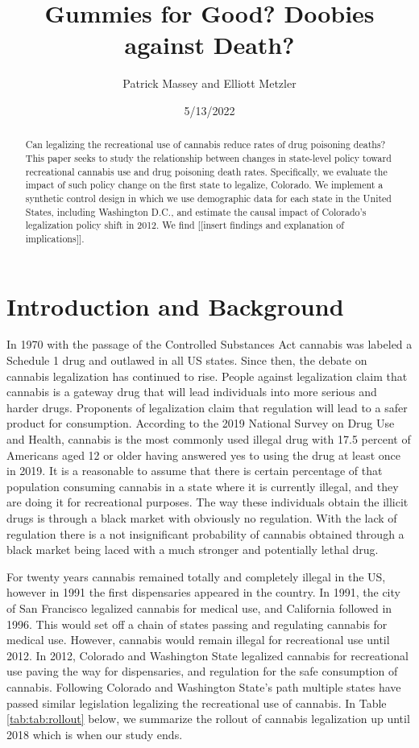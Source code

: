 \documentclass{article}
\author{Patrick Massey and Elliott Metzler}
\title{Gummies for Good? Doobies against Death?}
\date{5/13/2022}
\begin{document}
\maketitle

\begin{abstract}

Can legalizing the recreational use of cannabis reduce rates of drug poisoning deaths? This paper seeks to study the relationship between changes in state-level policy toward recreational cannabis use and drug poisoning death rates. Specifically, we evaluate the impact of such policy change on the first state to legalize, Colorado. We implement a synthetic control design in which we use demographic data for each state in the United States, including Washington D.C., and estimate the causal impact of Colorado's legalization policy shift in 2012. We find [[insert findings and explanation of implications]].

\end{abstract}

\newpage

\section{Introduction and Background}

In 1970 with the passage of the Controlled Substances Act cannabis was labeled a Schedule 1 drug and outlawed in all US states. Since then, the debate on cannabis legalization has continued to rise. People against legalization claim that cannabis is a gateway drug that will lead individuals into more serious and harder drugs. Proponents of legalization claim that regulation will lead to a safer product for consumption. According to the 2019 National Survey on Drug Use and Health, cannabis is the most commonly used illegal drug with 17.5 percent of Americans aged 12 or older having answered yes to using the drug at least once in 2019.  It is a reasonable to assume that there is certain percentage of that population consuming cannabis in a state where it is currently illegal, and they are doing it for recreational purposes. The way these individuals obtain the illicit drugs is through a black market with obviously no regulation. With the lack of regulation there is a not insignificant probability of cannabis obtained through a black market being laced with a much stronger and potentially lethal drug.

For twenty years cannabis remained totally and completely illegal in the US, however in 1991 the first dispensaries appeared in the country. In 1991, the city of San Francisco legalized cannabis for medical use, and California followed in 1996. This would set off a chain of states passing and regulating cannabis for medical use. However, cannabis would remain illegal for recreational use until 2012. In 2012, Colorado and Washington State legalized cannabis for recreational use paving the way for dispensaries, and regulation for the safe consumption of cannabis. Following Colorado and Washington State’s path multiple states have passed similar legislation legalizing the recreational use of cannabis. In Table \ref{tab:tab:rollout} below, we summarize the rollout of cannabis legalization up until 2018 which is when our study ends.
\end{document}

